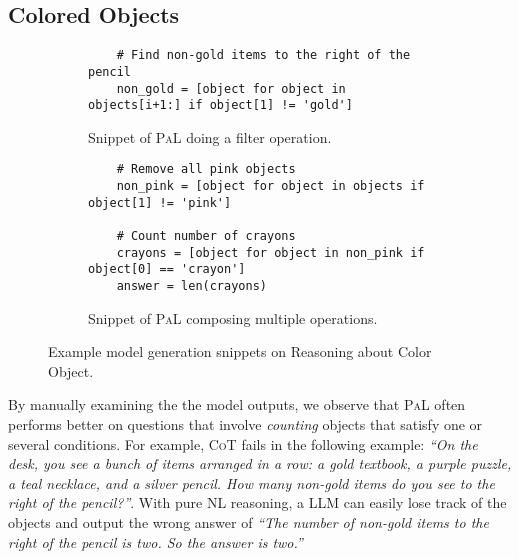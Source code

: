 \documentclass[dvipsnames]{article} \usepackage[accepted]{icml2022}
\newcommand{\ours}{\textsc{PaL}\xspace}
\newcommand{\cotp}{\textsc{CoT}\xspace}
\newcommand{\llm}{LLM\xspace}
\begin{document}
\subsection{Colored Objects}
\begin{figure*}[!h]
    \centering
    
    \begin{subfigure}[t]{.95\textwidth}
    
     \begin{verbatim}
    # Find non-gold items to the right of the pencil
    non_gold = [object for object in objects[i+1:] if object[1] != 'gold']
    \end{verbatim}
    \caption{Snippet of \ours doing a filter operation.}
    \label{fig:color-example:1}
    \end{subfigure}
    
    \begin{subfigure}[t]{.95\textwidth}
     \begin{verbatim}
    # Remove all pink objects
    non_pink = [object for object in objects if object[1] != 'pink']
    
    # Count number of crayons
    crayons = [object for object in non_pink if object[0] == 'crayon']
    answer = len(crayons)
    \end{verbatim}
    \caption{Snippet of \ours composing multiple operations.}
    \label{fig:color-example:2}
    \end{subfigure}
    
    \caption{Example model generation snippets on Reasoning about Color Object.}
    \label{fig:color-example}
     \end{figure*}

     By manually examining the the model outputs, we observe that \ours often performs better on questions that involve \emph{counting} objects that satisfy one or several conditions. 
     For example,  \cotp fails in the following example: \textit{``On the desk, you see a bunch of items arranged in a row: a gold textbook, a purple puzzle, a teal necklace, and a silver pencil. How many non-gold items do you see to the right of the pencil?''}.
     With pure NL reasoning, a \llm can easily lose track of the objects and output the wrong answer of \textit{``The number of non-gold items to the right of the pencil is two. So the answer is two.''} 
\end{document}
